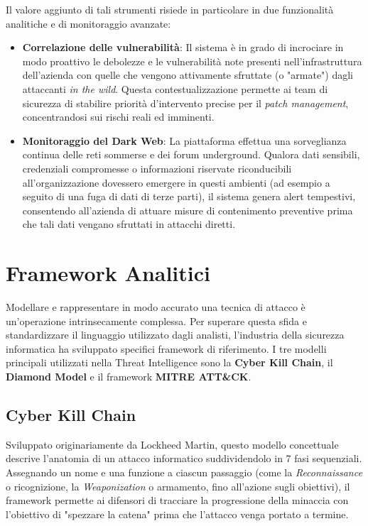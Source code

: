 Il valore aggiunto di tali strumenti risiede in particolare in due funzionalità 
analitiche e di monitoraggio avanzate:

\begin{itemize}
    \item \textbf{Correlazione delle vulnerabilità}: Il sistema è in grado di 
    incrociare in modo proattivo le debolezze e le vulnerabilità note presenti 
    nell'infrastruttura dell'azienda con quelle che vengono attivamente sfruttate 
    (o "armate") dagli attaccanti \textit{in the wild}. Questa contestualizzazione 
    permette ai team di sicurezza di stabilire priorità d'intervento precise per il 
    \textit{patch management}, concentrandosi sui rischi reali ed imminenti.
    \item \textbf{Monitoraggio del Dark Web}: La piattaforma effettua una 
    sorveglianza continua delle reti sommerse e dei forum underground. Qualora dati 
    sensibili, credenziali compromesse o informazioni riservate riconducibili 
    all'organizzazione dovessero emergere in questi ambienti (ad esempio a seguito di 
    una fuga di dati di terze parti), il sistema genera alert tempestivi, consentendo 
    all'azienda di attuare misure di contenimento preventive prima che tali dati 
    vengano sfruttati in attacchi diretti.
\end{itemize}

\section{Framework Analitici}

Modellare e rappresentare in modo accurato una tecnica di attacco è un'operazione 
intrinsecamente complessa. Per superare questa sfida e standardizzare il linguaggio 
utilizzato dagli analisti, l'industria della sicurezza informatica ha sviluppato 
specifici framework di riferimento. I tre modelli principali utilizzati nella Threat 
Intelligence sono la \textbf{Cyber Kill Chain}, il \textbf{Diamond Model} e il 
framework \textbf{MITRE ATT\&CK}.

\subsection{Cyber Kill Chain}

Sviluppato originariamente da Lockheed Martin, questo modello concettuale descrive 
l'anatomia di un attacco informatico suddividendolo in 7 fasi sequenziali. Assegnando 
un nome e una funzione a ciascun passaggio (come la \textit{Reconnaissance} o 
ricognizione, la \textit{Weaponization} o armamento, fino all'azione sugli obiettivi), 
il framework permette ai difensori di tracciare la progressione della minaccia con 
l'obiettivo di "spezzare la catena" prima che l'attacco venga portato a termine.

